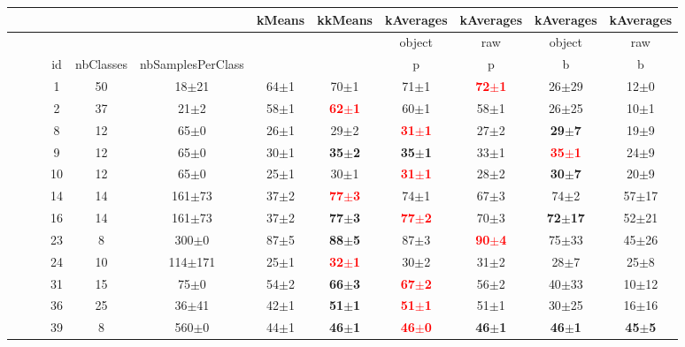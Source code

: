   
\begin{table} 
\begin{center} 
\small 
 \setlength{\tabcolsep}{.16667em} 
\begin{tabular}{lllccccccccc} 
 &  &  &  &  &  & kMeans & kkMeans & kAverages & kAverages & kAverages & kAverages \\ 
\hline 
 &  &  &  &  &  &  &  & object & raw & object & raw \\ 
 &  &  & id & nbClasses & nbSamplesPerClass &  &  & p & p & b & b \\ 
 &  &  &  1 & 50 &   18$\pm$21 &  64$\pm$1 &  70$\pm$1 &  71$\pm$1 & \textbf{\textcolor{red}{ 72$\pm$1}} & 26$\pm$29 &  12$\pm$0 \\ 
 &  &  &  2 & 37 &    21$\pm$2 &  58$\pm$1 & \textbf{\textcolor{red}{ 62$\pm$1}} &  60$\pm$1 &  58$\pm$1 & 26$\pm$25 &  10$\pm$1 \\ 
 &  &  &  8 & 12 &    65$\pm$0 & 26$\pm$1 & 29$\pm$2 & \textbf{\textcolor{red}{31$\pm$1}} & 27$\pm$2 & \textbf{29$\pm$7} & 19$\pm$9 \\ 
 &  &  &  9 & 12 &    65$\pm$0 & 30$\pm$1 & \textbf{35$\pm$2} & \textbf{35$\pm$1} & 33$\pm$1 & \textbf{\textcolor{red}{35$\pm$1}} & 24$\pm$9 \\ 
 &  &  & 10 & 12 &    65$\pm$0 & 25$\pm$1 & 30$\pm$1 & \textbf{\textcolor{red}{31$\pm$1}} & 28$\pm$2 & \textbf{30$\pm$7} & 20$\pm$9 \\ 
 &  &  & 14 & 14 &  161$\pm$73 &  37$\pm$2 & \textbf{\textcolor{red}{ 77$\pm$3}} &  74$\pm$1 &  67$\pm$3 &  74$\pm$2 & 57$\pm$17 \\ 
 &  &  & 16 & 14 &  161$\pm$73 &  37$\pm$2 & \textbf{ 77$\pm$3} & \textbf{\textcolor{red}{ 77$\pm$2}} &  70$\pm$3 & \textbf{72$\pm$17} & 52$\pm$21 \\ 
 &  &  & 23 &  8 &   300$\pm$0 &  87$\pm$5 & \textbf{ 88$\pm$5} &  87$\pm$3 & \textbf{\textcolor{red}{ 90$\pm$4}} & 75$\pm$33 & 45$\pm$26 \\ 
 &  &  & 24 & 10 & 114$\pm$171 & 25$\pm$1 & \textbf{\textcolor{red}{32$\pm$1}} & 30$\pm$2 & 31$\pm$2 & 28$\pm$7 & 25$\pm$8 \\ 
 &  &  & 31 & 15 &    75$\pm$0 &  54$\pm$2 & \textbf{ 66$\pm$3} & \textbf{\textcolor{red}{ 67$\pm$2}} &  56$\pm$2 & 40$\pm$33 & 10$\pm$12 \\ 
 &  &  & 36 & 25 &   36$\pm$41 &  42$\pm$1 & \textbf{ 51$\pm$1} & \textbf{\textcolor{red}{ 51$\pm$1}} &  51$\pm$1 & 30$\pm$25 & 16$\pm$16 \\ 
 &  &  & 39 &  8 &   560$\pm$0 & 44$\pm$1 & \textbf{46$\pm$1} & \textbf{\textcolor{red}{46$\pm$0}} & \textbf{46$\pm$1} & \textbf{46$\pm$1} & \textbf{45$\pm$5} \\ 

\end{tabular}
\end{center}
\end{table}
